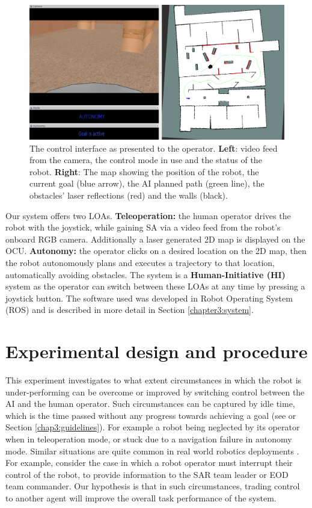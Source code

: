 \documentclass[a4paper,12pt,oneside,openright]{bhamthesis}
\begin{document}
\begin{figure}
	\centering
	\includegraphics[width=0.8\columnwidth]{chapter4_fig/interface.png}
	\caption{The control interface as presented to the operator. \textbf{Left}: video feed from the camera, the control mode in use and the status of the robot. \textbf{Right}: The map showing the position of the robot, the current goal (blue arrow), the AI planned path (green line), the obstacles' laser reflections (red) and the walls (black).} 
	\label{fig:interface_exp2}
\end{figure}

Our system offers two LOAs. \textbf{Teleoperation:} the human operator drives the robot with the joystick, while gaining SA via a video feed from the robot's onboard RGB camera. Additionally a laser generated 2D map is displayed on the OCU. \textbf{Autonomy:} the operator clicks on a desired location on the 2D map, then the robot autonomously plans and executes a trajectory to that location, automatically avoiding obstacles. The system is a \textbf{Human-Initiative (HI)} system as the operator can switch between these LOAs at any time by pressing a joystick button. The software used was developed in Robot Operating System (ROS) and is described in more detail in Section \ref{chapter3:system}.

\section{Experimental design and procedure}

This experiment investigates to what extent circumstances in which the robot is under-performing can be overcome or improved by switching control between the AI and the human operator. Such circumstances can be captured by idle time, which is the time passed without any progress towards achieving a goal (see \citep{Chiou2015} or Section \ref{chap3:guidelines}). For example a robot being neglected by its operator when in teleoperation mode, or stuck due to a navigation failure in autonomy mode. Similar situations are quite common in real world robotics deployments \citep{Murphy2004}. For example, consider the case in which a robot operator must interrupt their control of the robot, to provide information to the SAR team leader or EOD team commander. Our hypothesis is that in such circumstances, trading control to another agent will improve the overall task performance of the system. 
\end{document}
